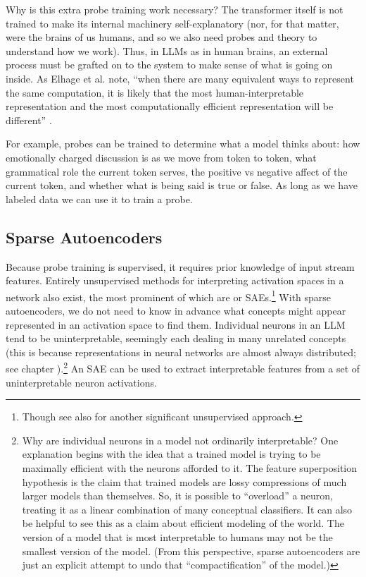 Why is this extra probe training work necessary? The transformer itself is not
trained to make its internal machinery self-explanatory (nor, for that matter,
were the brains of us humans, and so we also need probes and theory to
understand how we work). Thus, in LLMs as in human brains, an external process
must be grafted on to the system to make sense of what is going on inside. As
Elhage et al. note, ``when there are many equivalent ways to represent the same
computation, it is likely that the most human-interpretable representation and
the most computationally efficient representation will be different''
\cite{elhage2021mathematical}.

For example, probes can be trained to determine what a model thinks about: how
emotionally charged discussion is as we move from token to token, what
grammatical role the current token serves, the positive vs negative affect of
the current token, and whether what is being said is true or false. As long as
we have labeled data we can use it to train a probe.

\subsection{Sparse Autoencoders}

Because probe training is supervised, it requires prior knowledge of input
stream features. Entirely unsupervised methods for interpreting activation
spaces in a network also exist, the most prominent of which are
 or SAEs.\footnote{Though see also
\cite{burns2024discovering} for another significant unsupervised approach.}
With sparse autoencoders, we do not need to know in advance what concepts might
appear represented in an activation space to find them. Individual neurons in
an LLM tend to be uninterpretable, seemingly each dealing in many unrelated
concepts \cite{elhage2022superposition, scherlis2025polysemanticity} (this is
because representations in neural networks are almost always distributed; see
chapter ).\footnote{Why are individual neurons in a model not
ordinarily interpretable? One explanation begins with the idea that a trained
model is trying to be maximally efficient with the neurons afforded to it. The
feature superposition hypothesis is the claim that trained models are lossy
compressions of much larger models than themselves. So, it is possible to
``overload'' a neuron, treating it as a linear combination of many conceptual
classifiers. It can also be helpful to see this as a claim about efficient
modeling of the world. The version of a model that is most interpretable to
humans may not be the smallest version of the model. (From this perspective,
sparse autoencoders are just an explicit attempt to undo that
``compactification'' of the model.)} An SAE can be used to extract
interpretable features from a set of uninterpretable neuron activations.

